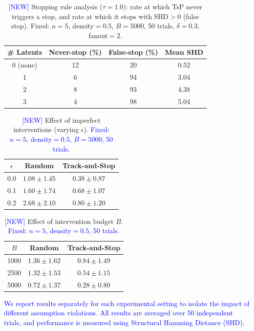 \documentclass{article}
\newcommand{\added}[1]{\textcolor{blue}{#1}}
\begin{document}
\begin{table}[h]
\centering
\caption{\added{[NEW]} Stopping rule analysis ($\tau=1.0$): rate at which TsP never triggers a stop, and rate at which it stops with SHD$>0$ (false stop). Fixed: $n=5$, density$=0.5$, $B=5000$, 50 trials, $\delta=0.3$, fanout$=2$.}
\label{tab:stopping}
\begin{tabular}{c|ccc}
\toprule
\# Latents & Never-stop (\%) & False-stop (\%) & Mean SHD \\
\midrule
0 (none) & 12 & 20 & 0.52 \\
1 & 6 & 94 & 3.04 \\
2 & 8 & 93 & 4.38 \\
3 & 4 & 98 & 5.04 \\
\bottomrule
\end{tabular}
\end{table}

\begin{table}[h]
\centering
\caption{\added{[NEW]} Effect of imperfect interventions (varying $\epsilon$). \added{Fixed: $n=5$, density$=0.5$, $B=5000$, 50 trials.}}
\label{tab:noisy_interventions}
\begin{tabular}{c|cc}
\toprule
$\epsilon$ & Random & Track-and-Stop \\
\midrule
0.0 & $1.08 \pm 1.45$ & $0.38 \pm 0.87$ \\
0.1 & $1.60 \pm 1.74$ & $0.68 \pm 1.07$ \\
0.2 & $2.68 \pm 2.10$ & $0.80 \pm 1.20$ \\
\bottomrule
\end{tabular}
\end{table}

\begin{table}[h]
\centering
\caption{\added{[NEW]} Effect of intervention budget $B$. \added{Fixed: $n=5$, density$=0.5$, 50 trials.}}
\label{tab:budget}
\begin{tabular}{c|cc}
\toprule
$B$ & Random & Track-and-Stop \\
\midrule
1000 & $1.36 \pm 1.62$ & $0.84 \pm 1.49$ \\
2500 & $1.32 \pm 1.53$ & $0.54 \pm 1.15$ \\
5000 & $0.72 \pm 1.37$ & $0.28 \pm 0.80$ \\
\bottomrule
\end{tabular}
\end{table}

\added{We report results separately for each experimental setting to isolate the impact of different assumption violations. All results are averaged over 50 independent trials, and performance is measured using Structural Hamming Distance (SHD).}
\end{document}
